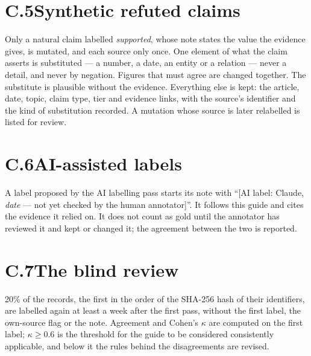 \section*{C.5\quad Synthetic refuted claims}

Only a natural claim labelled \emph{supported}, whose note states the
value the evidence gives, is mutated, and each source only once. One
element of what the claim asserts is substituted --- a number, a date,
an entity or a relation --- never a detail, and never by negation.
Figures that must agree are changed together. The substitute is
plausible without the evidence. Everything else is kept: the article,
date, topic, claim type, tier and evidence links, with the source's
identifier and the kind of substitution recorded. A mutation whose
source is later relabelled is listed for review.

\section*{C.6\quad AI-assisted labels}

A label proposed by the AI labelling pass starts its note with
``[AI label: Claude, \textit{date} --- not yet checked by the human
annotator]''. It follows this guide and cites the evidence it relied on.
It does not count as gold until the annotator has reviewed it and kept
or changed it; the agreement between the two is reported.

\section*{C.7\quad The blind review}

20\% of the records, the first in the order of the SHA-256 hash of
their identifiers, are labelled again at least a week after the first
pass, without the first label, the own-source flag or the note.
Agreement and Cohen's $\kappa$ are computed on the first label;
$\kappa \geq 0.6$ is the threshold for the guide to be considered
consistently applicable, and below it the rules behind the
disagreements are revised.
